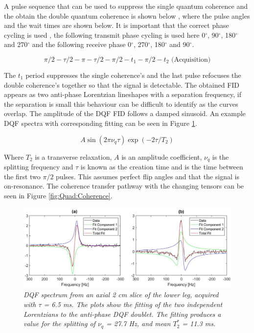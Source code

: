 \documentclass[class=article, crop=false]{standalone}
\begin{document}
A pulse sequence that can be used to suppress the single quantum coherence and the obtain the double quantum coherence is shown below \cite{Sharf1995DetectionNMR-Spectroscopy}, where the pulse angles and the wait times are shown below. It is important that the correct phase cycling is used \cite{Bodenhausen1984SelectionExperiments}, the following transmit phase cycling is used here 0$^\circ$, 90$^\circ$, 180$^\circ$ and 270$^\circ$ and the following receive phase 0$^\circ$, 270$^\circ$, 180$^\circ$ and 90$^\circ$. 

\begin{equation}
    \pi/2-\tau/2-\pi-\tau/2-\pi/2-t_1-\pi/2-t_2 \textrm{ (Acquisition)}
    \label{eqn:Quad:Pulse}
\end{equation}

The $t_1$ period suppresses the single coherence's and the last pulse refocuses the double coherence's together so that the signal is detectable. The obtained FID appears as two anti-phase Lorentzian lineshapes with a separation frequency, if the separation is small this behaviour can be difficult to identify as the curves overlap. The amplitude of the DQF FID follows a damped sinusoid. An example DQF spectra with corresponding fitting can be seen in Figure \ref{fig:Quad:Ex_DQF}.

\begin{equation}
    A\sin(2\pi\nu_q\tau)\exp(-2\tau/T_2)
    \label{eqn:Quad:Amplitude}
\end{equation}

Where $T_2$ is a transverse relaxation, $A$ is an amplitude coefficient, $\nu_q$ is the splitting frequency and $\tau$ is known as the creation time and is the time between the first two $\pi/2$ pulses. This assumes perfect flip angles and that the signal is on-resonance. The coherence transfer pathway with the changing tensors can be seen in Figure \ref{fig:Quad:Coherence}.

\begin{figure}
    \centering
    \includegraphics[width=1\textwidth]{Figures/Quad/Example_DQF.png}
    \caption{\textit{DQF spectrum from an axial 2 cm slice of the lower leg, acquired with $\tau$ = 6.5 ms. The plots show the fitting of the two independent Lorentzians to the anti-phase DQF doublet. The fitting produces a value for the splitting of $\nu_q$ = 27.7 Hz, and mean $T_2^*$ = 11.3 ms.}}
    \label{fig:Quad:Ex_DQF}
\end{figure}
\end{document}
